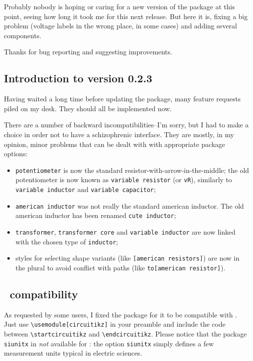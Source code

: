 \documentclass[a4paper]{article}
\begin{document}
Probably nobody is hoping or caring for a new version of the package at this point, seeing how long it took me for this next release. But here it is, fixing a big problem (voltage labels in the wrong place, in some cases) and adding several components.

Thanks for bug reporting and suggesting improvements.

\subsection{Introduction to version 0.2.3}

Having waited a long time before updating the package, many feature requests piled on my desk. They should all be implemented now.

There are a number of backward incompatibilities--I'm sorry, but I had to make a choice in order not to have a schizophrenic interface. They are mostly, in my opinion, minor problems that can be dealt with with appropriate package options:
\begin{itemize}
	\item \texttt{potentiometer} is now the standard resistor-with-arrow-in-the-middle; the old potentiometer is now known as \texttt{variable resistor} (or \texttt{vR}), similarly to \texttt{variable inductor} and \texttt{variable capacitor};
	\item \texttt{american inductor} was not really the standard american inductor. The old american inductor has been renamed \texttt{cute inductor};
	\item \texttt{transformer}, \texttt{transformer core} and \texttt{variable inductor} are now linked with the chosen type of \texttt{inductor};
	\item styles for selecting shape variants (like \texttt{[american resistors]}) are now in the plural to avoid conflict with paths (like \texttt{to[american resistor]}).
\end{itemize}

\subsection{\ConTeXt\ compatibility}

As requested by some users, I fixed the package for it to be compatible with \ConTeXt. Just use \verb!\usemodule[circuitikz]! in your preamble and include the code between \verb!\startcircuitikz! and \verb!\endcircuitikz!. Please notice that the package \texttt{siunitx} in \emph{not} available for \ConTeXt: the option \texttt{siunitx} simply defines a few measurement units typical in electric sciences.
\end{document}
